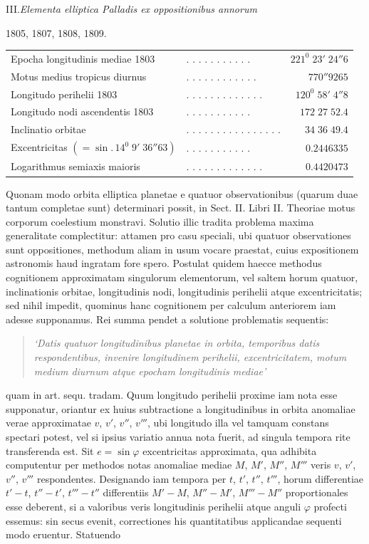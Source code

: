 \begin{center}III.\quad\textit{Elementa elliptica Palladis ex oppositionibus annorum}\par
1805, 1807, 1808, 1809.\end{center}
\begingroup\small\setlength{\tabcolsep}{2pt}
\noindent\begin{tabular}{@{}p{.51\linewidth}lr@{}}
Epocha longitudinis mediae 1803&. . . . . . . . . . .&$221^0\;23'\;24''6$\\
Motus medius tropicus diurnus&. . . . . . . . . . . .&$770''9265$\\
Longitudo perihelii 1803&. . . . . . . . . . . . .&$120^0\;58'\;4''8$\\
Longitudo nodi ascendentis 1803&. . . . . . . . . . .&$172\;27\;52.4$\\
Inclinatio orbitae&. . . . . . . . . . . . . . . .&$34\;36\;49.4$\\
Excentricitas $(=\sin.\,14^0\;9'\;36''63)$&. . . . . . . . . . .&$0.2446335$\\
Logarithmus semiaxis maioris&. . . . . . . . . . . . .&$0.4420473$
\end{tabular}\par\endgroup
{}
Quonam modo orbita elliptica planetae e quatuor observationibus (quarum duae tantum completae sunt) determinari possit, in Sect. II. Libri II. Theoriae motus corporum coelestium monstravi. Solutio illic tradita problema maxima generalitate complectitur: attamen pro casu speciali, ubi quatuor observationes sunt oppositiones, methodum aliam in usum vocare praestat, cuius expositionem astronomis haud ingratam fore spero. Postulat quidem haecce methodus cognitionem approximatam singulorum elementorum, vel saltem horum quatuor, inclinationis orbitae, longitudinis nodi, longitudinis perihelii atque excentricitatis; sed nihil impedit, quominus hanc cognitionem per calculum anteriorem iam adesse supponamus. Rei summa pendet a solutione problematis sequentis:
\begin{quote}\itshape
‘Datis quatuor longitudinibus planetae in orbita, temporibus datis respondentibus, invenire longitudinem perihelii, excentricitatem, motum medium diurnum atque epocham longitudinis mediae’
\end{quote}
quam in art. sequ. tradam.
Quum longitudo perihelii proxime iam nota esse supponatur, oriantur ex huius subtractione a longitudinibus in orbita anomaliae verae approximatae $v$, $v'$, $v''$, $v'''$, ubi longitudo illa vel tamquam constans spectari potest, vel si ipsius variatio annua nota fuerit, ad singula tempora rite transferenda est. Sit $e=\sin\varphi$ excentricitas approximata, qua adhibita computentur per methodos notas anomaliae mediae $M$, $M'$, $M''$, $M'''$ veris $v$, $v'$, $v''$, $v'''$ respondentes. Designando iam tempora per $t$, $t'$, $t''$, $t'''$, horum differentiae $t'-t$, $t''-t'$, $t'''-t''$ differentiis $M'-M$, $M''-M'$, $M'''-M''$ proportionales esse deberent, si a valoribus veris longitudinis perihelii atque anguli $\varphi$ profecti essemus: sin secus evenit, correctiones his quantitatibus applicandae sequenti modo eruentur. Statuendo
